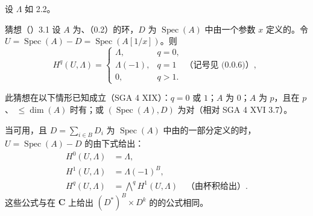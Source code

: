 设 $\Lambda$ 如 2.2。
\begin{SGAresult}{猜想（）}{3.1}
设 $A$ 为、（0.2）的环，$D$ 为 $\operatorname{Spec}(A)$ 中由一个参数 $x$ 定义的。令 $U=\operatorname{Spec}(A)-D=\operatorname{Spec}(A[1/x])$。则
\[
H^q(U,\Lambda)=
\begin{cases}
\Lambda,&q=0,\\
\Lambda(-1),&q=1\quad\text{（记号见 (0.0.6)）},\\
0,&q>1.
\end{cases}\tag{3.1.1}
\]
\end{SGAresult}
此猜想在以下情形已知成立（SGA 4 XIX）：$q=0$ 或 $1$；$A$ 为 $0$；$A$ 为 $p$，且在 $p$、 $\le\dim(A)$ 时有；或 $(\operatorname{Spec}(A),D)$ 为对（相对 SGA 4 XVI 3.7）。

当可用，且 $D=\sum_{i\in B}D_i$ 为 $\operatorname{Spec}(A)$ 中由的一部分定义的时，$U=\operatorname{Spec}(A)-D$ 的由下式给出：
\[
\begin{aligned}
H^0(U,\Lambda)&=\Lambda,\\
H^1(U,\Lambda)&=\Lambda(-1)^B,\\
H^q(U,\Lambda)&=\bigwedge^qH^1(U,\Lambda)\quad\text{（由杯积给出）}.
\end{aligned}\tag{3.1.2}
\]
这些公式与在 $\mathbf C$ 上给出 $(D^*)^B\times D^k$ 的的公式相同。


